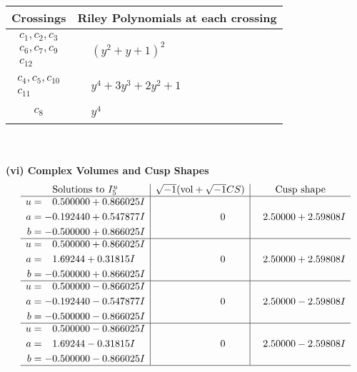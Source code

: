 \documentclass[1p]{elsarticle_modified}
\theoremstyle{definition}
\newcommand{\I}{\sqrt{-1}}
\begin{document}
\begin{tabular}{m{50pt}|m{274pt}}
Crossings & \hspace{64pt}Riley Polynomials at each crossing \\
\hline $$\begin{aligned}c_{1},c_{2},c_{3}\\c_{6},c_{7},c_{9}\\c_{12}\end{aligned}$$&$\begin{aligned}
&(y^2+y+1)^2
\end{aligned}$\\
\hline $$\begin{aligned}c_{4},c_{5},c_{10}\\c_{11}\end{aligned}$$&$\begin{aligned}
&y^4+3 y^3+2 y^2+1
\end{aligned}$\\
\hline $$\begin{aligned}c_{8}\end{aligned}$$&$\begin{aligned}
&y^4
\end{aligned}$\\
\hline
\end{tabular}\\~\\
\newpage\flushleft \textbf{(vi) Complex Volumes and Cusp Shapes}
$$\begin{array}{c|c|c}  
\text{Solutions to }I^u_{5}& \I (\text{vol} + \sqrt{-1}CS) & \text{Cusp shape}\\
 \hline 
\begin{aligned}
u &= \phantom{-}0.500000 + 0.866025 I \\
a &= -0.192440 + 0.547877 I \\
b &= -0.500000 + 0.866025 I\end{aligned}
 & \phantom{-0.000000 } 0 & \phantom{-}2.50000 + 2.59808 I \\ \hline\begin{aligned}
u &= \phantom{-}0.500000 + 0.866025 I \\
a &= \phantom{-}1.69244 + 0.31815 I \\
b &= -0.500000 + 0.866025 I\end{aligned}
 & \phantom{-0.000000 } 0 & \phantom{-}2.50000 + 2.59808 I \\ \hline\begin{aligned}
u &= \phantom{-}0.500000 - 0.866025 I \\
a &= -0.192440 - 0.547877 I \\
b &= -0.500000 - 0.866025 I\end{aligned}
 & \phantom{-0.000000 } 0 & \phantom{-}2.50000 - 2.59808 I \\ \hline\begin{aligned}
u &= \phantom{-}0.500000 - 0.866025 I \\
a &= \phantom{-}1.69244 - 0.31815 I \\
b &= -0.500000 - 0.866025 I\end{aligned}
 & \phantom{-0.000000 } 0 & \phantom{-}2.50000 - 2.59808 I\\
 \hline 
 \end{array}$$\newpage\newpage\renewcommand{\arraystretch}{1}
\end{document}

